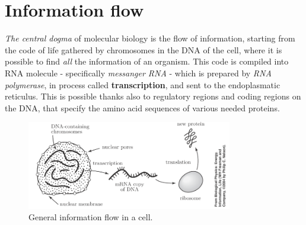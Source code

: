 \documentclass[../main/main.tex]{subfiles}
\begin{document}
\section{Information flow}



\emph{The central dogma} of molecular biology is the flow of information, starting from the code of life gathered by chromosomes in the DNA of the cell, where it is possible to find \emph{all} the information of an organism. This code is compiled into RNA molecule - specifically \emph{messanger RNA} - which is prepared by \emph{RNA polymerase}, in process called \textbf{transcription}, and sent to the endoplasmatic reticulus. This is possible thanks also to regulatory regions and coding regions on the DNA, that specify the amino acid sequences of various needed proteins. 
\begin{figure}[h!]
    \centering
    \includegraphics[width=0.8\textwidth]{../frontespizio/tikz/4_lesson/information_flow.PNG}
    \caption{General information flow in a cell.}
\end{figure}
\end{document}
